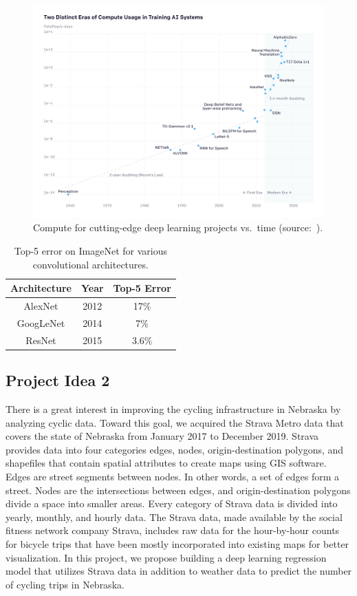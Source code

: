 \documentclass{report}
\begin{document}
\begin{figure}
    \centering
    \includegraphics[width=\textwidth]{figs/ai-and-compute-all-2.png}
    \caption{Compute for cutting-edge deep learning projects vs.\ time (source:~\cite{AI-compute18}).}
    \label{fig:compute}
\end{figure}

\begin{table}[]
    \centering \caption{Top-5 error on ImageNet for various convolutional architectures.}
    \begin{tabular}{|c|c|c|} \hline
      Architecture   &  Year & Top-5 Error \\ \hline
    AlexNet & 2012     & 17\% \\
    GoogLeNet & 2014 & 7\% \\
    ResNet & 2015 & 3.6\% \\ \hline
    \end{tabular}
 
    \label{tab:CNN-perf}
\end{table}

\subsection{Project Idea 2}
There is a great interest in improving the cycling infrastructure in Nebraska by analyzing cyclic data. Toward this goal, we acquired the Strava Metro data that covers the state of Nebraska from January 2017 to December 2019.  Strava provides data into four categories edges, nodes, origin-destination polygons, and shapefiles that contain spatial attributes to create maps using GIS software. Edges are street segments between nodes. In other words, a set of edges form a street. Nodes are the intersections between edges, and origin-destination polygons divide a space into smaller areas. Every category of Strava data is divided into yearly, monthly, and hourly data. The Strava data, made available by the social fitness network company Strava, includes raw data for the hour-by-hour counts for bicycle trips that have been mostly incorporated into existing maps for better visualization. In this project, we propose building a deep learning regression model that utilizes Strava data in addition to weather data to predict the number of cycling trips in Nebraska. 
\end{document}
